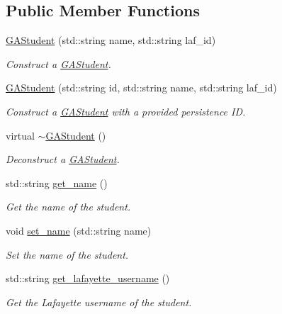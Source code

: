 \subsection*{Public Member Functions}
\begin{DoxyCompactItemize}
\item 
\hyperlink{class_g_a_student_a83c98a132e18c6f630028f3ee4e94fb2}{G\+A\+Student} (std\+::string name, std\+::string laf\+\_\+id)
\begin{DoxyCompactList}\small\item\em Construct a \hyperlink{class_g_a_student}{G\+A\+Student}. \end{DoxyCompactList}\item 
\hyperlink{class_g_a_student_a781128a3ff0098a7df81760c6ea8d9c8}{G\+A\+Student} (std\+::string id, std\+::string name, std\+::string laf\+\_\+id)
\begin{DoxyCompactList}\small\item\em Construct a \hyperlink{class_g_a_student}{G\+A\+Student} with a provided persistence ID. \end{DoxyCompactList}\item 
virtual \hyperlink{class_g_a_student_a8bf2b66d9d4bf773d903d8e0c26faf22}{$\sim$\+G\+A\+Student} ()
\begin{DoxyCompactList}\small\item\em Deconstruct a \hyperlink{class_g_a_student}{G\+A\+Student}. \end{DoxyCompactList}\item 
std\+::string \hyperlink{class_g_a_student_a2424100663a950f60d02b70b00610dde}{get\+\_\+name} ()
\begin{DoxyCompactList}\small\item\em Get the name of the student. \end{DoxyCompactList}\item 
void \hyperlink{class_g_a_student_ab8224579ce2618e60455a8a73b1473f9}{set\+\_\+name} (std\+::string name)
\begin{DoxyCompactList}\small\item\em Set the name of the student. \end{DoxyCompactList}\item 
std\+::string \hyperlink{class_g_a_student_ad3f1ce3ab268f13812fbf126a2ca018a}{get\+\_\+lafayette\+\_\+username} ()
\begin{DoxyCompactList}\small\item\em Get the Lafayette username of the student. \end{DoxyCompactList}\item 

\end{DoxyCompactItemize}
